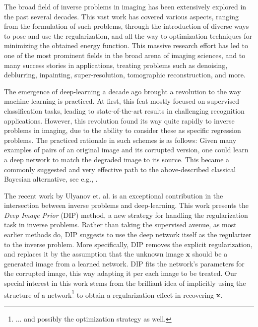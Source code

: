 \documentclass[12pt]{article}
\def\x{{\mathbf x}}
\begin{document}
The broad field of inverse problems in imaging has been extensively explored in the past several decades. This vast work has covered various aspects, ranging from the formulation of such problems, through the introduction of diverse ways to pose and use the regularization, and all the way to optimization techniques for minimizing the obtained energy function. This massive research effort has led to one of the most prominent fields in the broad arena of imaging sciences, and to many success stories in applications, treating problems such as denoising, deblurring, inpainting, super-resolution, tomographic reconstruction, and more.

The emergence of deep-learning a decade ago brought a revolution to the way machine learning is practiced. At first, this feat mostly focused on supervised classification tasks, leading to state-of-the-art results in challenging recognition applications. However, this revolution found its way quite rapidly to inverse problems in imaging, due to the ability to consider these as specific regression problems. The practiced rationale in such schemes is as follows: Given many examples of pairs of an original image and its corrupted version, one could learn a deep network to match the degraded image to its source. This became a commonly suggested and very effective path to the above-described classical Bayesian alternative, see e.g., \cite{DL1, DL2, DL3, DL4, DL5, DL6, DL7, DL8, DL9, IRCNN, DL11, DL12}. 

The recent work by Ulyanov et. al. \cite{DIP-2018,DIP-Journal-2018} is an exceptional contribution in the intersection between inverse problems and deep-learning. This work presents the \emph{Deep Image Prior} (DIP) method, a new strategy for handling the regularization task in inverse problems. Rather than taking the supervised avenue, as most earlier methods do, DIP suggests to use the deep network itself as the regularizer to the inverse problem. More specifically, DIP removes the explicit regularization, and replaces it by the assumption that the unknown image $\x$ should be a generated image from a learned network. DIP fits the network's parameters for the corrupted image, this way adapting it per each image to be treated. Our special interest in this work stems from the brilliant idea of implicitly using the structure of a network\footnote{... and possibly the optimization strategy as well.}  to obtain a regularization effect in recovering $\x$. 
\end{document}
